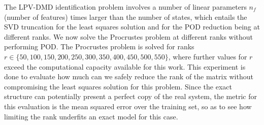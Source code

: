 The LPV-DMD identification problem involves a number of linear parameters $n_f$ (number of features) times larger than the number of states, which entails the SVD truncation for the least squares solution and for the POD reduction being at different ranks.
%
We now solve the Procrustes problem at different ranks without performing POD.
%
The Procrustes problem is solved for ranks $r \in \{50,100,150,200,250,300,350, 400, 450, 500, 550\}$, where further values for $r$ exceed the computational capacity available for this work.
%
This experiment is done to evaluate how much can we safely reduce the rank of the matrix without compromising the least squares solution for this problem.
%
Since the exact structure can potentially present a perfect copy of the real system, the metric for this evaluation is the mean squared error over the training set, so as to see how limiting the rank underfits an exact model for this case.








